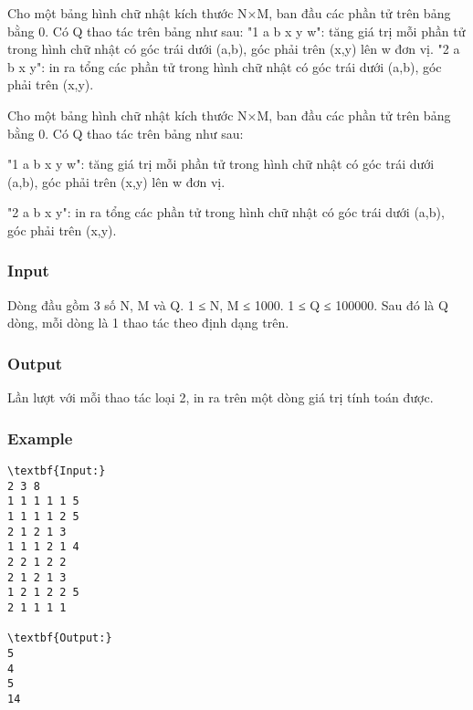 



     Cho một bảng hình chữ nhật kích thước N×M, ban đầu các phần tử trên bảng bằng 0. Có Q thao       tác trên bảng như sau:       "1 a b x y w": tăng giá trị mỗi phần tử trong hình chữ nhật có góc trái dưới (a,b), góc phải trên       (x,y) lên w đơn vị.       "2 a b x y": in ra tổng các phần tử trong hình chữ nhật có góc trái dưới (a,b), góc phải trên (x,y).    

   Cho một bảng hình chữ nhật kích thước N×M, ban đầu các phần tử trên bảng bằng 0. Có Q thao tác trên bảng như sau:  

   "1 a b x y w": tăng giá trị mỗi phần tử trong hình chữ nhật có góc trái dưới (a,b), góc phải trên (x,y) lên w đơn vị.  

   "2 a b x y": in ra tổng các phần tử trong hình chữ nhật có góc trái dưới (a,b), góc phải trên (x,y).  



\subsubsection{   Input  }

   Dòng đầu gồm 3 số N, M và Q. 1 ≤ N, M ≤ 1000. 1 ≤ Q ≤ 100000. Sau đó là Q dòng, mỗi dòng là 1 thao tác theo định dạng trên.  

\subsubsection{   Output  }

   Lần lượt với mỗi thao tác loại 2, in ra trên một dòng giá trị tính toán được.  

\subsubsection{   Example  }
\begin{verbatim}
\textbf{Input:}
2 3 8
1 1 1 1 1 5
1 1 1 1 2 5
2 1 2 1 3
1 1 1 2 1 4
2 2 1 2 2
2 1 2 1 3
1 2 1 2 2 5
2 1 1 1 1

\textbf{Output:}
5
4
5
14
\end{verbatim}